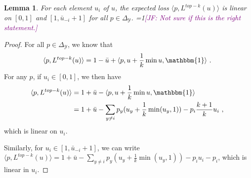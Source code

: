 \documentclass[12pt]{article}
\newcommand{\Comments}{1}
\newcommand{\mynote}[2]{\ifnum\Comments=1\textcolor{#1}{#2}\fi}
\newcommand{\jessie}[1]{\mynote{purple}{[JF: #1]}}
\newcommand{\simplex}{\Delta_\Y}
\newcommand{\Y}{\mathcal{Y}}
\newcommand{\inprod}[2]{\langle #1, #2 \rangle}%
\newcommand{\ones}{\mathbbm{1}}
\newtheorem{lemma}{Lemma}
\begin{document}
\begin{lemma}\label{lem:linear-pieces}
	For each element $u_i$ of $u$, the expected loss $\inprod{p}{L^{top-k}(u)}$ is linear on $[0,1]$ and $[1, \bar u_{-i} + 1]$ for all $p \in \simplex$.
	\jessie{Not sure if this is the right statement.}	
\end{lemma}
\begin{proof}
	For all $p \in \simplex$, we know that 
	\begin{equation}
	\inprod{p}{L^{top-k}(u)} = 1 - \bar u + \inprod{p}{u + \frac 1 k \min{u,\ones}}~.~
	\end{equation}
	For any $p$, if $u_i \in [0,1]$, we then have 
	\begin{align*}
	\inprod{p}{L^{top-k}(u)} &= 1 + \bar u - \inprod{p}{u + \frac 1 k \min{u,\ones}}\\
	 &= 1 + \bar u - \sum_{y \neq i}p_y (u_y + \frac 1 k \min(u_y, 1)) - p_i \frac {k+1} k u_i~,~
	\end{align*}
	which is linear on $u_i$.
	
	Similarly, for $u_i \in [1, \bar u_{-i} + 1]$, we can write $\inprod{p}{L^{top-k}(u)} = 1 + \bar u - \sum_{y \neq i}p_y (u_y + \frac 1 k \min(u_y, 1)) - p_i u_i - p_i$, which is linear in $u_i$.
\end{proof}
\end{document}
